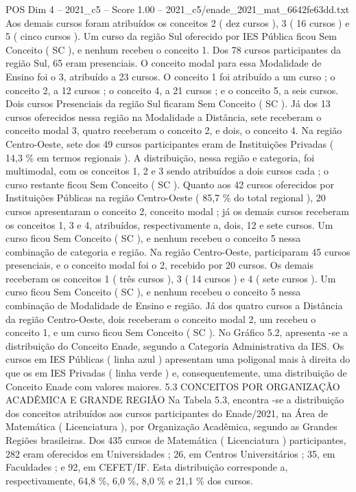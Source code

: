 \begin{textsample}{POS Dim 4 – 2021\_c5 – Score 1.00 – 2021\_c5/enade\_2021\_mat\_6642fe63dd.txt}
Aos demais cursos foram atribuídos os conceitos 2 ( dez cursos ), 3 ( 16 cursos ) e 5 ( cinco cursos ).
Um curso da região Sul oferecido por IES Pública ficou Sem Conceito ( SC ), e nenhum recebeu o conceito 1.
Dos 78 cursos participantes da região Sul, 65 eram presenciais.
O conceito modal para essa Modalidade de Ensino foi o 3, atribuído a 23 cursos.
O conceito 1 foi atribuído a um curso ; o conceito 2, a 12 cursos ; o conceito 4, a 21 cursos ; e o conceito 5, a seis cursos.
Dois cursos Presenciais da região Sul ficaram Sem Conceito ( SC ).
Já dos 13 cursos oferecidos nessa região na Modalidade a Distância, sete receberam o conceito modal 3, quatro receberam o conceito 2, e dois, o conceito 4.
Na região Centro-Oeste, sete dos 49 cursos participantes eram de Instituições Privadas ( 14,3 \% em termos regionais ).
A distribuição, nessa região e categoria, foi multimodal, com os conceitos 1, 2 e 3 sendo atribuídos a dois cursos cada ; o curso restante ficou Sem Conceito ( SC ).
Quanto aos 42 cursos oferecidos por Instituições Públicas na região Centro-Oeste ( 85,7 \% do total regional ), 20 cursos apresentaram o conceito 2, conceito modal ; já os demais cursos receberam os conceitos 1, 3 e 4, atribuídos, respectivamente a, dois, 12 e sete cursos.
Um curso ficou Sem Conceito ( SC ), e nenhum recebeu o conceito 5 nessa combinação de categoria e região.
Na região Centro-Oeste, participaram 45 cursos presenciais, e o conceito modal foi o 2, recebido por 20 cursos.
Os demais receberam os conceitos 1 ( três cursos ), 3 ( 14 cursos ) e 4 ( sete cursos ).
Um curso ficou Sem Conceito ( SC ), e nenhum recebeu o conceito 5 nessa combinação de Modalidade de Ensino e região.
Já dos quatro cursos a Distância da região Centro-Oeste, dois receberam o conceito modal 2, um recebeu o conceito 1, e um curso ficou Sem Conceito ( SC ).
No Gráfico 5.2, apresenta -se a distribuição do Conceito Enade, segundo a Categoria Administrativa da IES.
Os cursos em IES Públicas ( linha azul ) apresentam uma poligonal mais à direita do que os em IES Privadas ( linha verde ) e, consequentemente, uma distribuição de Conceito Enade com valores maiores. 5.3 CONCEITOS POR ORGANIZAÇÃO ACADÊMICA E GRANDE REGIÃO Na Tabela 5.3, encontra -se a distribuição dos conceitos atribuídos aos cursos participantes do Enade/2021, na Área de Matemática ( Licenciatura ), por Organização Acadêmica, segundo as Grandes Regiões brasileiras.
Dos 435 cursos de Matemática ( Licenciatura ) participantes, 282 eram oferecidos em Universidades ; 26, em Centros Universitários ; 35, em Faculdades ; e 92, em CEFET/IF.
Esta distribuição corresponde a, respectivamente, 64,8 \%, 6,0 \%, 8,0 \% e 21,1 \% dos cursos.

\end{textsample}
